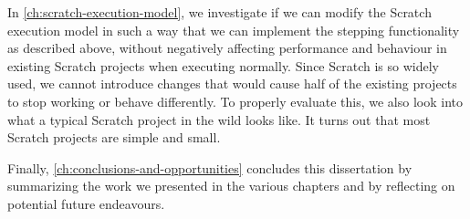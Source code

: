 \documentclass[main]{subfiles}
\begin{document}
In \cref{ch:scratch-execution-model}, we investigate if we can modify the Scratch execution model in such a way that we can implement the stepping functionality as described above, without negatively affecting performance and behaviour in existing Scratch projects when executing normally.
Since Scratch is so widely used, we cannot introduce changes that would cause half of the existing projects to stop working or behave differently.
To properly evaluate this, we also look into what a typical Scratch project in the wild looks like.
It turns out that most Scratch projects are simple and small.

Finally, \cref{ch:conclusions-and-opportunities} concludes this dissertation by summarizing the work we presented in the various chapters and by reflecting on potential future endeavours.
\end{document}

